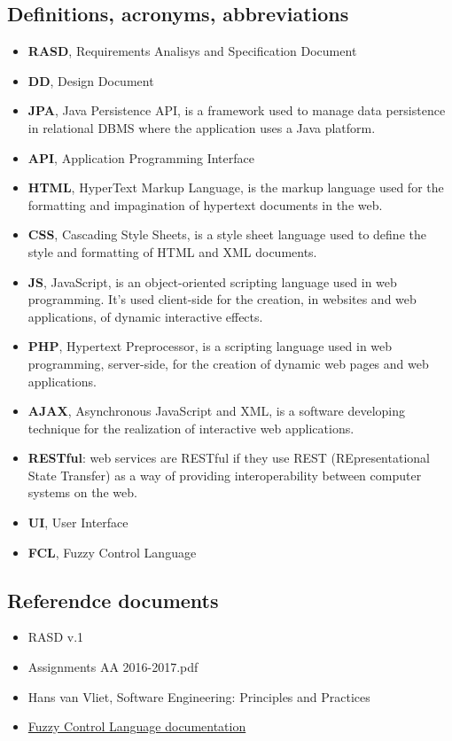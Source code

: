 \subsection{Definitions, acronyms, abbreviations}
	\begin{itemize}
		\item \textbf{RASD}, Requirements Analisys and Specification Document
		\item \textbf{DD}, Design Document
		\item \textbf{JPA}, Java Persistence API, is a framework used to manage data persistence in relational DBMS where the application uses a Java platform.
		\item \textbf{API}, Application Programming Interface
		\item \textbf{HTML}, HyperText Markup Language, is the markup language used for the formatting and impagination of hypertext documents in the web.
		\item \textbf{CSS}, Cascading Style Sheets, is a style sheet language used to define the style and formatting of HTML and XML documents.
		\item \textbf{JS}, JavaScript, is an object-oriented scripting language used in web programming. It's used client-side for the creation, in websites and web applications, of dynamic interactive effects.
		\item \textbf{PHP}, Hypertext Preprocessor, is a scripting language used in web programming, server-side, for the creation of dynamic web pages and web applications.
		\item \textbf{AJAX}, Asynchronous JavaScript and XML, is a software developing technique for the realization of interactive web applications.
		\item \textbf{RESTful}: web services are RESTful if they use REST (REpresentational State Transfer) as a way of providing interoperability between computer systems on the web.
		\item \textbf{UI}, User Interface
		\item \textbf{FCL}, Fuzzy Control Language
	\end{itemize}

\subsection{Referendce documents}
	\begin{itemize}
		\item RASD v.1
		\item Assignments AA 2016-2017.pdf
		\item Hans van Vliet, Software Engineering: Principles and Practices
		\item \href{http://ffll.sourceforge.net/fcl.htm}{Fuzzy Control Language documentation}
	\end{itemize}

